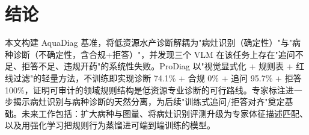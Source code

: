 ﻿\section{结论}
\label{sec:conclusion}

本文构建 AquaDiag 基准，将低资源水产诊断解耦为"病灶识别（确定性）"与"病种诊断（不确定性，含合规+拒答）"，并发现三个 VLM 在该任务上存在"追问不足、拒答不足、违规开药"的系统性失败。ProDiag 以"视觉显式化 + 规则表 + 红线过滤"的轻量方法，不训练即实现诊断 74.1\% + 合规 0\% + 追问 95.7\% + 拒答 100\%，证明可审计的领域规则结构是低资源专业诊断的可行路线。专家标注进一步揭示病灶识别与病种诊断的天然分离，为后续"训练式追问/拒答对齐"奠定基础。未来工作包括：扩大病种与图量、将病灶识别评测升级为专家体征描述匹配、以及用强化学习把规则行为蒸馏进可端到端训练的模型。
